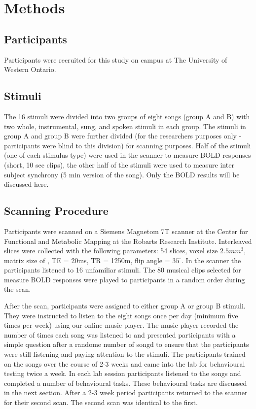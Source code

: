 \documentclass[12pt,letterpaper]{report}
\begin{document}
\section{Methods}
\subsection{Participants}
Participants were recruited for this study on campus at The University of Western Ontario. 
\subsection{Stimuli}
The 16 stimuli were divided into two groups of eight songs (group A and B) with two whole, instrumental, sung, and spoken stimuli in each group.
The stimuli in group A and group B were further divided (for the researchers purposes only - participants were blind to this division) for scanning purposes.
Half of the stimuli (one of each stimulus type) were used in the scanner to measure BOLD responses (short, 10 sec clips), the other half of the stimuli were used to measure inter subject synchrony (5 min version of the song). Only the BOLD results will be discussed here. 
\subsection{Scanning Procedure}
Participants were scanned on a  Siemens Magnetom 7T scanner at the Center for Functional and Metabolic Mapping at the Robarts Research Institute. 
Interleaved slices were collected with the following parameters: 54 slices, voxel size $2.5mm^3$, matrix size of ,  TE = 20ms, TR = 1250m, flip angle = $35^{\circ}$. 
In the scanner the participants listened to 16 unfamiliar stimuli. 
The 80 musical clips selected for measure BOLD responses were played to participants in a random order during the scan. 


After the scan, participants were assigned to either group A or group B stimuli. They were instructed to listen to the eight songs once per day (minimum five times per week) using our online music player. 
The music player recorded the number of times each song was listened to and presented participants with a simple question after a randome number of songd to ensure that the participants were still listening and paying attention to the stimuli. 
The participants trained on the songs over the course of 2-3 weeks and came into the lab for behavioural testing twice a week. 
In each lab session participants listened to the songs and completed a number of behavioural tasks. These behavioural tasks are discussed in the next section. 
After a 2-3 week period participants returned to the scanner for their second scan. The second scan was identical to the first.
\end{document}
